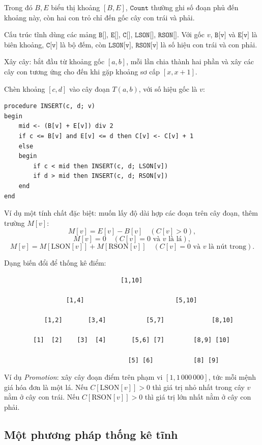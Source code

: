 \documentclass[11pt]{article}
\begin{document}
Trong đó \(B,E\) biểu thị khoảng \([B,E]\), \(\texttt{Count}\) thường ghi số
đoạn phủ đến khoảng này, còn hai con trỏ chỉ đến gốc cây con trái và phải.

Cấu trúc tĩnh dùng các mảng \(\texttt{B[]}\), \(\texttt{E[]}\), \(\texttt{C[]}\),
\(\texttt{LSON[]}\), \(\texttt{RSON[]}\). Với gốc \(v\), \(\texttt{B[v]}\) và
\(\texttt{E[v]}\) là biên khoảng, \(\texttt{C[v]}\) là bộ đếm, còn
\(\texttt{LSON[v]}\), \(\texttt{RSON[v]}\) là số hiệu con trái và con phải.

Xây cây: bắt đầu từ khoảng gốc \([a,b]\), mỗi lần chia thành hai phần và xây
các cây con tương ứng cho đến khi gặp khoảng sơ cấp \([x,x+1]\).

Chèn khoảng \([c,d]\) vào cây đoạn \(T(a,b)\), với số hiệu gốc là \(v\):

\begin{verbatim}
procedure INSERT(c, d; v)
begin
    mid <- (B[v] + E[v]) div 2
    if c <= B[v] and E[v] <= d then C[v] <- C[v] + 1
    else
    begin
        if c < mid then INSERT(c, d; LSON[v])
        if d > mid then INSERT(c, d; RSON[v])
    end
end
\end{verbatim}

Ví dụ một tính chất đặc biệt: muốn lấy độ dài hợp các đoạn trên cây đoạn,
thêm trường \(M[v]\):
\[
M[v]=E[v]-B[v]\quad(C[v]>0),
\]
\[
M[v]=0\quad(C[v]=0\text{ và }v\text{ là lá}),
\]
\[
M[v]=M[\mathrm{LSON}[v]]+M[\mathrm{RSON}[v]]
\quad(C[v]=0\text{ và }v\text{ là nút trong}).
\]

Dạng biến đổi để thống kê điểm:

\begin{verbatim}
                                [1,10]

                 [1,4]                         [5,10]

           [1,2]       [3,4]           [5,7]             [8,10]

        [1]  [2]    [3]  [4]       [5,6] [7]        [8,9] [10]

                                  [5] [6]           [8] [9]
\end{verbatim}

Ví dụ \textit{Promotion}: xây cây đoạn điểm trên phạm vi \([1,1\,000\,000]\),
tức mỗi mệnh giá hóa đơn là một lá. Nếu \(C[\mathrm{LSON}[v]]>0\) thì giá trị
nhỏ nhất trong cây \(v\) nằm ở cây con trái. Nếu
\(C[\mathrm{RSON}[v]]>0\) thì giá trị lớn nhất nằm ở cây con phải.

\subsection{Một phương pháp thống kê tĩnh}
\end{document}

